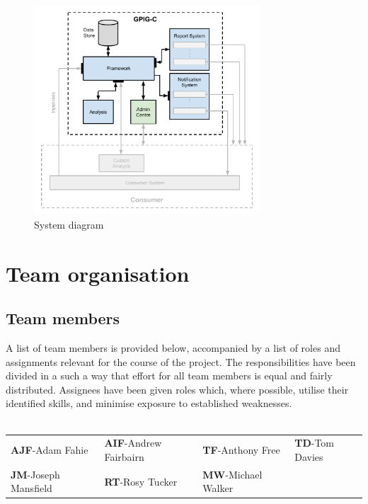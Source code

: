 \documentclass[10pt,a4paper]{article}
\begin{document}


\begin{figure}[hptb]
  \centering
\includegraphics[width=0.75\textwidth]{system-architecture.pdf}
  \caption{System diagram}
\end{figure}

\section{Team organisation}

\subsection{Team members}
A list of team members is provided below, accompanied by a list of roles and
assignments relevant for the course of the project. The responsibilities have
been divided in a such a way that effort for all team members is equal and
fairly distributed. Assignees have been given roles which, where possible,
utilise their identified skills, and minimise exposure to established
weaknesses. \\
\\
\begin{tabular}{  p{4cm}  p{4cm}  p{4cm} p{4cm}  }
\textbf{AJF}-Adam Fahie            &         \textbf{AIF}-Andrew Fairbairn    &     \textbf{TF}-Anthony Free          &        \textbf{TD}-Tom Davies \\
\textbf{JM}-Joseph Mansfield     &        \textbf{RT}-Rosy Tucker           &          \textbf{MW}-Michael Walker \\
\end{tabular}
\end{document}
